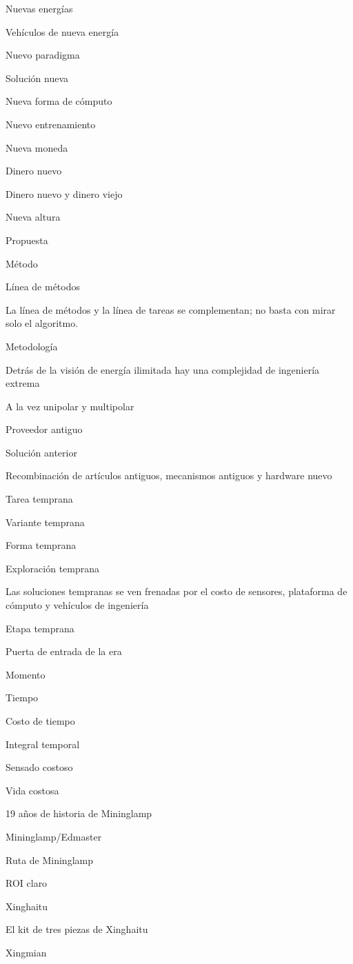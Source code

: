 \documentclass{article}
\begin{document}
Nuevas energías

Vehículos de nueva energía

Nuevo paradigma

Solución nueva

Nueva forma de cómputo

Nuevo entrenamiento

Nueva moneda

Dinero nuevo

Dinero nuevo y dinero viejo

Nueva altura

Propuesta

Método

Línea de métodos

La línea de métodos y la línea de tareas se complementan; no basta con mirar solo el algoritmo.

Metodología

Detrás de la visión de energía ilimitada hay una complejidad de ingeniería extrema

A la vez unipolar y multipolar

Proveedor antiguo

Solución anterior

Recombinación de artículos antiguos, mecanismos antiguos y hardware nuevo

Tarea temprana

Variante temprana

Forma temprana

Exploración temprana

Las soluciones tempranas se ven frenadas por el costo de sensores, plataforma de cómputo y vehículos de ingeniería

Etapa temprana

Puerta de entrada de la era

Momento

Tiempo

Costo de tiempo

Integral temporal

Sensado costoso

Vida costosa

19 años de historia de Mininglamp

Mininglamp/Edmaster

Ruta de Mininglamp

ROI claro

Xinghaitu

El kit de tres piezas de Xinghaitu

Xingmian
\end{document}
